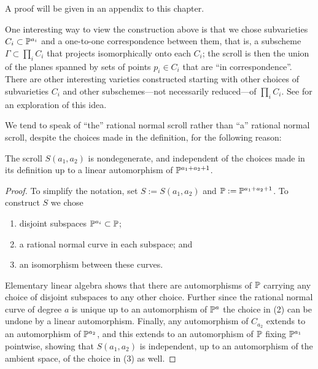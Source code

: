 A proof will be given in an appendix to this chapter.

One interesting way to view the construction above is that we chose subvarieties $C_{i}\subset \PP^{a_{i}}$ and a one-to-one correspondence between them, that is, a subscheme
$\Gamma\subset \prod_{i}C_{i}$ that projects isomorphically onto each $C_{i}$; the scroll is then the
union of the planes spanned by sets of points $p_{i}\in C_{i}$ that are ``in correspondence''. There are other interesting varieties constructed starting with other choices of subvarieties $C_{i}$ and other subschemes---not necessarily reduced---of $\prod_{i}C_{i}$. See \cite{Eisenbud-Sammartano} for an exploration of this idea.

We tend to speak of ``the'' rational normal scroll rather than ``a'' rational normal scroll, despite the choices made in the definition, for the following reason:

\begin{proposition}\label{uniqueness of scrolls}
The scroll $S(a_1,a_2)$ is nondegenerate, and independent of the choices made in its
 definition up to a linear automorphism of $\PP^{a_1+a_2+1}$. 
\end{proposition}
\begin{proof} 
To simplify the notation, set $S := S(a_{1}, a_{2})$ and $\PP := \PP^{a_1+a_2+1}$.
To construct $S$ we chose 
\begin{enumerate}
 \item disjoint subspaces $\PP^{a_i}\subset \PP$;
 \item a rational normal curve in each subspace; and
 \item an isomorphism between these curves.
\end{enumerate}
Elementary linear algebra shows that there are automorphisms of $\PP$ carrying any choice of disjoint subspaces to any other choice. Further since the rational normal curve of degree $a$ is unique up to an automorphism of $\PP^{a}$ the choice in (2) can be undone by a linear automorphism. Finally, any automorphism of $C_{a_{2}}$ extends to an automorphism of $\PP^{a_{2}}$, and this extends to an automorphism of $\PP$ fixing $\PP^{a_{1}}$ pointwise,
showing that $S(a_{1}, a_{2})$ is independent, up to an automorphism of the ambient space, of the choice in (3)  as well.
\end{proof}


